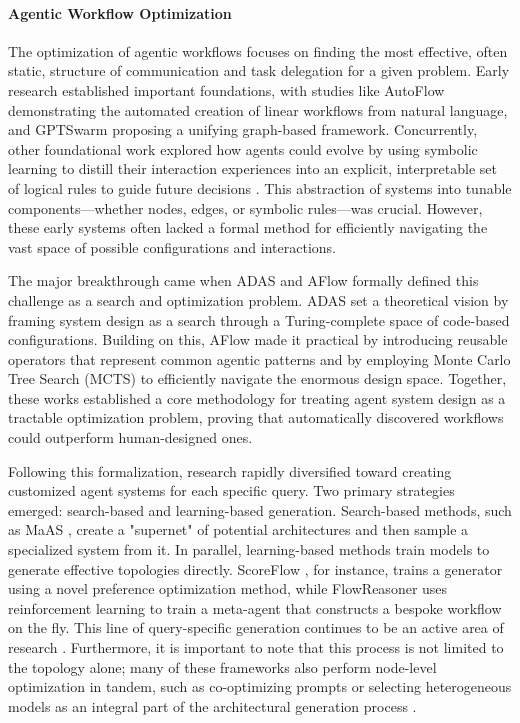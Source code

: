 \documentclass[10pt]{article} %
\begin{document}
\paragraph{Agentic Workflow Optimization}

The optimization of agentic workflows focuses on finding the most effective, often static, structure of communication and task delegation for a given problem. Early research established important foundations, with studies like AutoFlow \citep{li2024autoflow} demonstrating the automated creation of linear workflows from natural language, and GPTSwarm \citep{zhuge2024gptswarm} proposing a unifying graph-based framework. Concurrently, other foundational work explored how agents could evolve by using symbolic learning to distill their interaction experiences into an explicit, interpretable set of logical rules to guide future decisions \citep{zhou2024symbolic}. This abstraction of systems into tunable components—whether nodes, edges, or symbolic rules—was crucial. However, these early systems often lacked a formal method for efficiently navigating the vast space of possible configurations and interactions.

The major breakthrough came when ADAS \citep{hu2024automated} and AFlow \citep{zhang2024aflow} formally defined this challenge as a search and optimization problem. ADAS set a theoretical vision by framing system design as a search through a Turing-complete space of code-based configurations. Building on this, AFlow made it practical by introducing reusable operators that represent common agentic patterns and by employing Monte Carlo Tree Search (MCTS) to efficiently navigate the enormous design space.
Together, these works established a core methodology for treating agent system design as a tractable optimization problem, proving that automatically discovered workflows could outperform human-designed ones.

Following this formalization, research rapidly diversified toward creating customized agent systems for each specific query. Two primary strategies emerged: search-based and learning-based generation. Search-based methods, such as MaAS \citep{zhang2025maas}, create a "supernet" of potential architectures and then sample a specialized system from it. In parallel, learning-based methods train models to generate effective topologies directly. ScoreFlow \citep{wang2025scoreflow}, for instance, trains a generator using a novel preference optimization method, while FlowReasoner \citep{gao2025flowreasoner} uses reinforcement learning to train a meta-agent that constructs a bespoke workflow on the fly. This line of query-specific generation continues to be an active area of research \citep{ye2025masgpt, ke2025maszero}. Furthermore, it is important to note that this process is not limited to the topology alone; many of these frameworks also perform node-level optimization in tandem, such as co-optimizing prompts or selecting heterogeneous models as an integral part of the architectural generation process \citep{zhang2024aflow, zhou2025maasprompt, zhang2025evoflow}.
\end{document}
